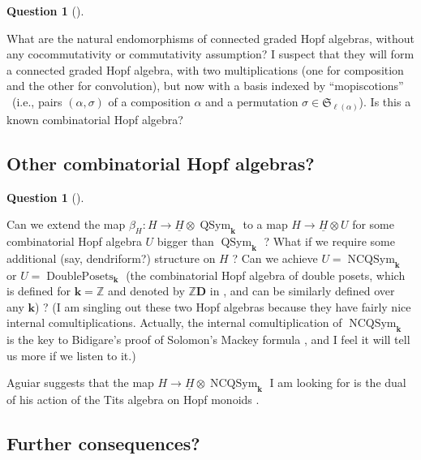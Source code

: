 \documentclass
[numbers=enddot,12pt,final,onecolumn,notitlepage,abstracton]{scrartcl}%
\theoremstyle{definition}
\newtheorem{quest}[theo]{Question}
\newenvironment{question}[1][]
{\begin{quest}[#1]\begin{leftbar}}
{\end{leftbar}\end{quest}}
\newenvironment{question}[1][Question]{\noindent\textbf{#1.} }{\ \rule{0.5em}{0.5em}}
\begin{document}
\begin{question}
\label{quest.noncocomm}What are the natural endomorphisms of connected graded
Hopf algebras, without any cocommutativity or commutativity assumption? I
suspect that they will form a connected graded Hopf algebra, with two
multiplications (one for composition and the other for convolution), but now
with a basis indexed by \textquotedblleft mopiscotions\textquotedblright%
\ (i.e., pairs $\left(  \alpha,\sigma\right)  $ of a composition $\alpha$ and
a permutation $\sigma\in\mathfrak{S}_{\ell\left(  \alpha\right)  }$). Is this
a known combinatorial Hopf algebra?
\end{question}

\subsection{Other combinatorial Hopf algebras?}

\begin{question}
\label{quest.bigger}Can we extend the map $\beta_{H}:H\rightarrow
\underline{H}\otimes\operatorname*{QSym}\nolimits_{\mathbf{k}}$ to a map
$H\rightarrow\underline{H}\otimes U$ for some combinatorial Hopf algebra $U$
bigger than $\operatorname*{QSym}\nolimits_{\mathbf{k}}$ ? What if we require
some additional (say, dendriform?) structure on $H$ ? Can we achieve
$U=\operatorname*{NCQSym}\nolimits_{\mathbf{k}}$ or
$U=\operatorname*{DoublePosets}\nolimits_{\mathbf{k}}$ (the combinatorial Hopf
algebra of double posets, which is defined for $\mathbf{k}=\mathbb{Z}$ and
denoted by $\mathbb{Z}\mathbf{D}$ in \cite{Mal-Reu-DP}, and can be similarly
defined over any $\mathbf{k}$) ? (I am singling out these two Hopf algebras
because they have fairly nice internal comultiplications. Actually, the
internal comultiplication of $\operatorname*{NCQSym}\nolimits_{\mathbf{k}}$ is
the key to Bidigare's proof of Solomon's Mackey formula \cite[\S 2]{Schocker},
and I feel it will tell us more if we listen to it.)

Aguiar suggests that the map $H\rightarrow\underline{H}\otimes
\operatorname*{NCQSym}\nolimits_{\mathbf{k}}$ I am looking for is the dual of
his action of the Tits algebra on Hopf monoids \cite[Proposition 88]{Aguiar13}.
\end{question}

\subsection{Further consequences?}
\end{document}
